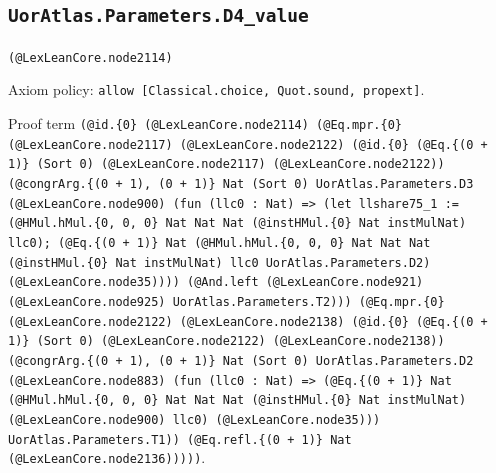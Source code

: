 \documentclass[11pt]{article}
\begin{document}
\subsection*{\texttt{UorAtlas.Parameters.D4\_value}}
\noindent\texttt{(@LexLeanCore.node2114)}\par
\noindent Axiom policy: \texttt{allow [Classical.choice, Quot.sound, propext]}.\par
\noindent Proof term \texttt{(@id.\{0\} (@LexLeanCore.node2114) (@Eq.mpr.\{0\} (@LexLeanCore.node2117) (@LexLeanCore.node2122) (@id.\{0\} (@Eq.\{(0 + 1)\} (Sort 0) (@LexLeanCore.node2117) (@LexLeanCore.node2122)) (@congrArg.\{(0 + 1), (0 + 1)\} Nat (Sort 0) UorAtlas.Parameters.D3 (@LexLeanCore.node900) (fun (llc0 : Nat) => (let llshare75\_1 := (@HMul.hMul.\{0, 0, 0\} Nat Nat Nat (@instHMul.\{0\} Nat instMulNat) llc0); (@Eq.\{(0 + 1)\} Nat (@HMul.hMul.\{0, 0, 0\} Nat Nat Nat (@instHMul.\{0\} Nat instMulNat) llc0 UorAtlas.Parameters.D2) (@LexLeanCore.node35)))) (@And.left (@LexLeanCore.node921) (@LexLeanCore.node925) UorAtlas.Parameters.T2))) (@Eq.mpr.\{0\} (@LexLeanCore.node2122) (@LexLeanCore.node2138) (@id.\{0\} (@Eq.\{(0 + 1)\} (Sort 0) (@LexLeanCore.node2122) (@LexLeanCore.node2138)) (@congrArg.\{(0 + 1), (0 + 1)\} Nat (Sort 0) UorAtlas.Parameters.D2 (@LexLeanCore.node883) (fun (llc0 : Nat) => (@Eq.\{(0 + 1)\} Nat (@HMul.hMul.\{0, 0, 0\} Nat Nat Nat (@instHMul.\{0\} Nat instMulNat) (@LexLeanCore.node900) llc0) (@LexLeanCore.node35))) UorAtlas.Parameters.T1)) (@Eq.refl.\{(0 + 1)\} Nat (@LexLeanCore.node2136)))))}.\par
\end{document}
